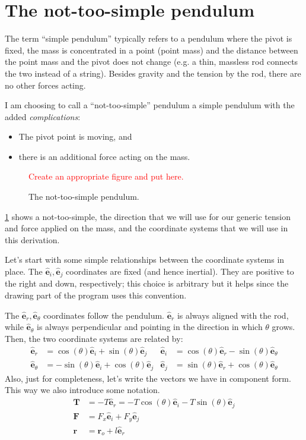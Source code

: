 \documentclass{article}
\newcommand{\vct}{\mathbf}     %
\newcommand{\uvc}[1]{\hat{\mathbf{#1}}} %
\newcommand{\er}{\uvc{e}_r}      %
\newcommand{\et}{\uvc{e}_\theta} %
\newcommand{\ei}{\uvc{e}_i}      %
\newcommand{\ej}{\uvc{e}_j}      %
\newcommand{\nf}{F}              %
\newcommand{\vf}{\vct{\nf}}      %
\newcommand{\nt}{T}              %
\newcommand{\vt}{\vct{\nt}}      %
\newcommand{\ro}{\vct{r}_{o}}    %
\newcommand{\vr}{\vct{r}}        %
\newcommand{\ntsp}{not-too-simple\xspace}
\newcommand{\todo}[1]{\textcolor{red}{#1}}
\begin{document}
\section{The \ntsp pendulum}
The term ``simple pendulum'' typically refers to a pendulum where the pivot is fixed, the mass is concentrated in a point (point mass) and the distance between the point mass and the pivot does not change (e.g. a thin, massless rod connects the two instead of a string). Besides gravity and the tension by the rod, there are no other forces acting.

I am choosing to call a ``\ntsp'' pendulum a simple pendulum with the added \emph{complications}:
\begin{itemize}
  \item The pivot point is moving, and
  \item there is an additional force acting on the mass.
\end{itemize}

\begin{figure}[ht]
  \centering
  \todo{Create an appropriate figure and put here.}
  \caption{The \ntsp pendulum.}
  \label{f:ntsp}
\end{figure}

\cref{f:ntsp} shows a \ntsp, the direction that we will use for our generic tension and force applied on the mass, and the coordinate systems that we will use in this derivation.

Let's start with some simple relationships between the coordinate systems in place. The ${\ei,\ej}$ coordinates are fixed (and hence inertial). They are positive to the right and down, respectively; this choice is arbitrary but it helps since the drawing part of the program uses this convention.

The ${\er,\et}$ coordinates follow the pendulum. $\er$ is always aligned with the rod, while $\et$ is always perpendicular and pointing in the direction in which $\theta$ grows. Then, the two coordinate systems are related by:
\begin{equation}
\begin{aligned}
  \er &= \cos(\theta)\ei+\sin(\theta)\ej & \ei &= \cos(\theta)\er - \sin(\theta)\et \\
  \et &=-\sin(\theta)\ei+\cos(\theta)\ej & \ej &= \sin(\theta)\er + \cos(\theta)\et
\end{aligned}
\label{e:cs}
\end{equation}
Also, just for completeness, let's write the vectors we have in component form. This way we also introduce some notation.
\begin{align}
  \vt&=-\nt\er = -\nt\cos(\theta)\ei-\nt\sin(\theta)\ej\\
  \vf&=\nf_x\ei+\nf_y\ej\\
  \vr&=\ro+l\er \label{e:pos}
\end{align}
\end{document}
